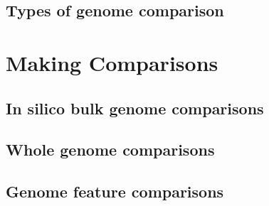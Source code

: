 \subsection{Types of genome comparison}


\section{Making Comparisons}

\subsection{In silico bulk genome comparisons}

\subsection{Whole genome comparisons}

\subsection{Genome feature comparisons}





